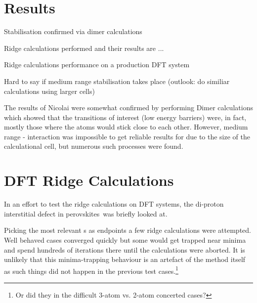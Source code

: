 \section{Results}
\label{sec:perovskites-results}

\bit
\item Stabilisation confirmed via dimer calculations
\item Ridge calculations performed and their results are ...
\item Ridge calculations performance on a production DFT system
\item Hard to say if medium range stabilisation takes place (outlook: do similiar calculations using larger cells)
\eit


The results of Nicolai were somewhat confirmed by performing Dimer calculations which showed that the transitions of interest (low energy barriers) were, in fact, mostly those where the  atoms would stick close to each other.
However, medium range - interaction was impossible to get reliable results for due to the size of the calculational cell, but numerous such processes were found.

\section{DFT Ridge Calculations}
In an effort to test the ridge calculations on DFT systems, the di-proton interstitial defect in  perovskites~\citemiss was briefly looked at.

Picking the most relevant s as endpoints a few ridge calculations were attempted.
Well behaved cases converged quickly but some would get trapped near minima and spend hundreds of iterations there until the calculations were aborted.
It is unlikely that this minima-trapping behaviour is an artefact of the method itself as such things did not happen in the previous test cases.\footnote{Or did they in the difficult 3-atom vs. 2-atom concerted cases?}




